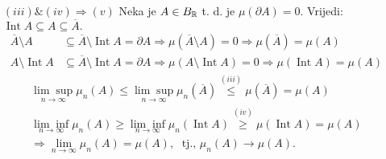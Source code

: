 \documentclass{article}
\newcommand{\Int}{\operatorname{Int}}
\begin{document}
\begin{itemize}
    \item[\(\boxed{(iii)\& (iv)\Rightarrow (v)}\)] Neka je \(A\in B_{\Bbb R}\) t. d. je \(\mu(\partial A)=0.\) Vrijedi: \(\Int A\subseteq A\subseteq\overline A.\) \[\begin{aligned}\overline A\setminus A&\subseteq\overline A\setminus\Int A=\partial A\Rightarrow\mu(\overline A\setminus A)=0\Rightarrow\mu\left(\overline A\right)=\mu(A)\\A\setminus\Int A&\subseteq\overline A\setminus\Int A=\partial A\Rightarrow\mu(A\setminus\Int A)=0\Rightarrow\mu(\Int A)=\mu(A)\end{aligned}\]\[\begin{aligned}\underset{n\to\infty}{\lim\sup }\mu_n(A)\le\underset{n\to\infty}{\lim\sup }\mu_n(\overline A)\overset{(iii)}{\le}\mu(\overline A)=\mu(A)\\\underset{n\to\infty}{\lim\inf }\mu_n(A)\ge\underset{n\to\infty}{\lim\inf }\mu_n(\Int A)\overset{(iv)}{\ge}\mu(\Int A)=\mu(A)\\\Rightarrow\lim_{n\to\infty}\mu_n(A)=\mu(A),\;\text{ tj., }\mu_n(A)\to\mu(A).\end{aligned}\] 

\end{itemize}
\end{document}
